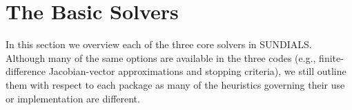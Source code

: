 \section{The Basic Solvers}\label{s:basic_solvers}

In this section we overview each of the three core solvers in SUNDIALS.
Although many of the same options are available in the three codes 
(e.g., finite-difference Jacobian-vector approximations 
and stopping criteria), we still outline them with respect to each package
as many of the heuristics governing their use or 
implementation are different.

